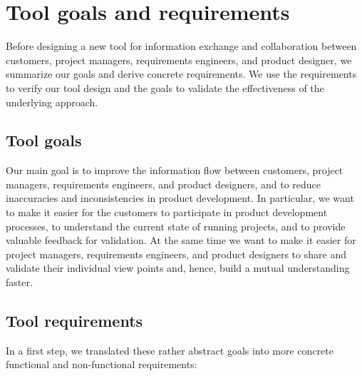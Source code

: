 \section{Tool goals and requirements}
\label{sec:requirements}

Before designing a new tool for information exchange and collaboration between customers, project managers, requirements engineers, and product designer, we summarize our goals and derive concrete requirements.
We use the requirements to verify our tool design and the goals to validate the effectiveness of the underlying approach.

\subsection{Tool goals}

Our main goal is to improve the information flow between customers, project managers, requirements engineers, and product designers, and to reduce inaccuracies and inconsistencies in product development.
In particular, we want to make it easier for the customers to participate in product development processes, to understand the current state of running projects, and to provide valuable feedback for validation.
At the same time we want to make it easier for project managers, requirements engineers, and product designers to share and validate their individual view points and, hence, build a mutual understanding faster.

\subsection{Tool requirements}

In a first step, we translated these rather abstract goals into more concrete functional and non-functional requirements:

